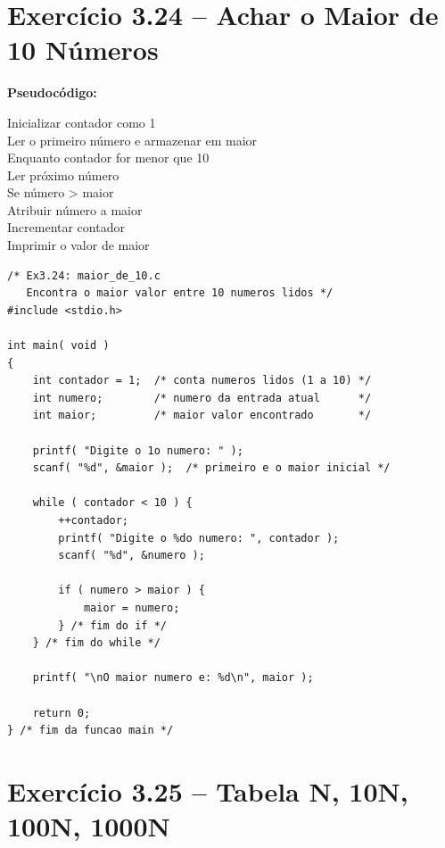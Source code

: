\documentclass[12pt,a4paper]{article}
\begin{document}
\newpage

\section{Exercício 3.24 -- Achar o Maior de 10 Números}

\begin{respostabox}
\textbf{Pseudocódigo:}
\begin{pseudo}
Inicializar contador como 1\\
Ler o primeiro número e armazenar em maior\\
Enquanto contador for menor que 10\\
\hphantom{En}Ler próximo número\\
\hphantom{En}Se número > maior\\
\hphantom{Enxx}Atribuir número a maior\\
\hphantom{En}Incrementar contador\\
Imprimir o valor de maior
\end{pseudo}

\begin{lstlisting}
/* Ex3.24: maior_de_10.c
   Encontra o maior valor entre 10 numeros lidos */
#include <stdio.h>

int main( void )
{
    int contador = 1;  /* conta numeros lidos (1 a 10) */
    int numero;        /* numero da entrada atual      */
    int maior;         /* maior valor encontrado       */

    printf( "Digite o 1o numero: " );
    scanf( "%d", &maior );  /* primeiro e o maior inicial */

    while ( contador < 10 ) {
        ++contador;
        printf( "Digite o %do numero: ", contador );
        scanf( "%d", &numero );

        if ( numero > maior ) {
            maior = numero;
        } /* fim do if */
    } /* fim do while */

    printf( "\nO maior numero e: %d\n", maior );

    return 0;
} /* fim da funcao main */
\end{lstlisting}
\end{respostabox}

\section{Exercício 3.25 -- Tabela N, 10N, 100N, 1000N}
\end{document}
